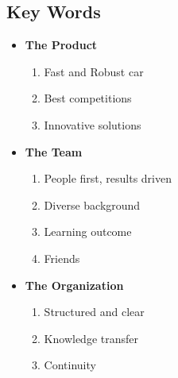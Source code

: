 \documentclass[graybox]{svmult}
\begin{document}
\subsection*{Key Words}
\begin{itemize}
    \item \textbf{The Product}
    \begin{enumerate}
        \item Fast and Robust car
        \item Best competitions
        \item Innovative solutions
    \end{enumerate}
    \item \textbf{The Team}
    \begin{enumerate}
        \item People first, results driven
        \item Diverse background
        \item Learning outcome
        \item Friends
    \end{enumerate}
    \item \textbf{The Organization}
    \begin{enumerate}
        \item Structured and clear
        \item Knowledge transfer
        \item Continuity
    \end{enumerate}
\end{itemize}
\end{document}

